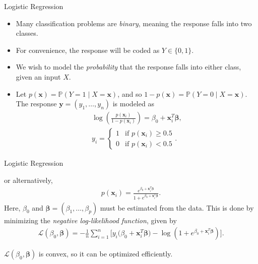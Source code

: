 \documentclass[8pt]{beamer}
\newcommand{\mydef}[1]{\textcolor{SteelBlue3}{\textit{#1}}} %
\begin{document}
\begin{frame}{Logistic Regression}
\begin{itemize}
    \item Many classification problems are \mydef{binary}, meaning the response falls into two classes. 
    
    \item For convenience, the response will be coded as $Y \in \{ 0,1 \}$.
    
    \item We wish to model the \mydef{probability} that the response falls into either class, given an input $X$. 
    
    \item Let $p(\bm{x}) = \mathbb{P}(Y = 1 \mid X = \bm{x})$, and so $1 - p(\bm{x}) = \mathbb{P}(Y = 0 \mid X = \bm{x})$. The response $\mathbf{y} = (y_1, \ldots, y_n)$ is modeled as 
    \begin{align*}
    \log \left( \frac{p(\bm{x}_i)}{1 - p(\bm{x}_i)} \right) = \beta_0 + \bm{x}_i^T \bm{\beta}, \\
    y_i = \begin{cases}
        1 & \text{if } p(\bm{x}_i) \ge 0.5 \\
        0 & \text{if } p(\bm{x}_i) < 0.5
    \end{cases}.
    \end{align*}

\end{itemize}
\end{frame}



\begin{frame}{Logistic Regression}

or alternatively, 
    \begin{align*}
    p(\bm{x}_i) = \frac{e^{\beta_0 + \bm{x}_i^T \bm{\beta}}}{1 + e^{\beta_0 + \bm{x}_i^T \bm{\beta}}}.
    \end{align*}
Here, $\beta_0$ and $\bm{\beta} = (\beta_1, \ldots, \beta_p)$ must be estimated from the data. This is done by minimizing the \mydef{negative log-likelihood function}, given by 
\begin{align}
\label{negloglike}
    \mathcal{L}(\beta_0, \bm{\beta}) = - \frac{1}{n} \sum_{i = 1}^n \Big[ y_i\big(\beta_0 + \bm{x}_i^T \bm{\beta}\big) - \log \left(1 + e^{\beta_0 + \bm{x}_i^T \bm{\beta}}  \right) \Big]. 
\end{align}

$\mathcal{L}(\beta_0, \bm{\beta})$ is convex, so it can be optimized efficiently.

\end{frame}
\end{document}
